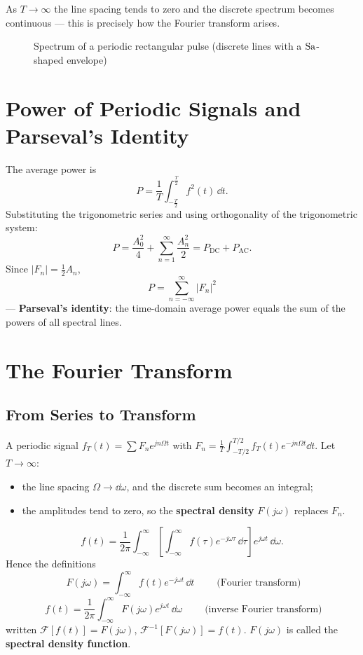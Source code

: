 As $T\to\infty$ the line spacing tends to zero and the discrete spectrum
becomes continuous --- this is precisely how the Fourier transform arises.

\begin{figure}[htbp]
\centering
\caption{Spectrum of a periodic rectangular pulse (discrete lines with a
$\operatorname{Sa}$-shaped envelope)}
\end{figure}

\section{Power of Periodic Signals and Parseval's Identity}

The average power is
\[
    P=\frac{1}{T}\int_{-\frac{T}{2}}^{\frac{T}{2}}f^{2}(t)\,\dd t .
\]
Substituting the trigonometric series and using orthogonality of the
trigonometric system:
\[
    P=\frac{A_0^{2}}{4}+\sum_{n=1}^{\infty}\frac{A_n^{2}}{2}
     =P_{\text{DC}}+P_{\text{AC}} .
\]
Since $|F_n|=\frac{1}{2}A_n$,
\[
    \boxed{\;P=\sum_{n=-\infty}^{\infty}|F_n|^{2}\;}
\]
--- \textbf{Parseval's identity}: the time-domain average power equals the sum
of the powers of all spectral lines.

\section{The Fourier Transform}

\subsection{From Series to Transform}

A periodic signal $f_T(t)=\sum F_ne^{jn\Omega t}$ with
$F_n=\frac{1}{T}\int_{-T/2}^{T/2}f_T(t)e^{-jn\Omega t}\dd t$. Let $T\to\infty$:

\begin{itemize}
    \item the line spacing $\Omega\to\dd\omega$, and the discrete sum becomes
          an integral;
    \item the amplitudes tend to zero, so the \textbf{spectral density}
          $F(j\omega)$ replaces $F_n$.
\end{itemize}

\[
    f(t)=\frac{1}{2\pi}\int_{-\infty}^{\infty}
    \left[\int_{-\infty}^{\infty}f(\tau)e^{-j\omega\tau}\,\dd\tau\right]
    e^{j\omega t}\,\dd\omega .
\]
Hence the definitions
\[
    \boxed{\;F(j\omega)=\int_{-\infty}^{\infty}f(t)e^{-j\omega t}\,\dd t\;}
    \qquad\text{(Fourier transform)}
\]
\[
    \boxed{\;f(t)=\frac{1}{2\pi}\int_{-\infty}^{\infty}F(j\omega)e^{j\omega t}\,\dd\omega\;}
    \qquad\text{(inverse Fourier transform)}
\]
written $\mathcal{F}[f(t)]=F(j\omega)$,
$\mathcal{F}^{-1}[F(j\omega)]=f(t)$. $F(j\omega)$ is called the
\textbf{spectral density function}.

